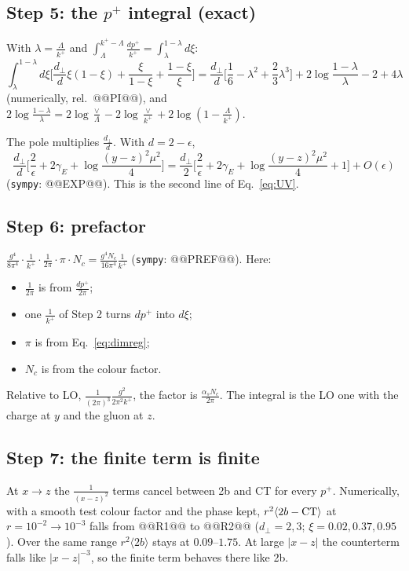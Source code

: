 \documentclass[10pt]{article}
\numberwithin{equation}{section}
\begin{document}
\subsection*{Step 5: the \texorpdfstring{$p^+$}{p+} integral (exact)}
With $\lambda=\frac{\Lambda}{k^+}$ and $\int_\Lambda^{k^+-\Lambda}\frac{dp^+}{k^+}=\int_\lambda^{1-\lambda}d\xi$:
\begin{equation}
\int_\lambda^{1-\lambda}d\xi\Big[\frac{d_\perp}{d}\xi(1-\xi)+\frac{\xi}{1-\xi}+\frac{1-\xi}{\xi}\Big]=\frac{d_\perp}{d}\Big[\frac16-\lambda^2+\frac23\lambda^3\Big]+2\log\frac{1-\lambda}{\lambda}-2+4\lambda
\end{equation}
(numerically, rel.\ @@PI@@), and $2\log\frac{1-\lambda}{\lambda}=2\log\frac{\vee}{\Lambda}-2\log\frac{\vee}{k^+}+2\log(1-\frac{\Lambda}{k^+})$.

The pole multiplies $\frac{d_\perp}{d}$. With $d=2-\epsilon$,
\begin{equation*}
\frac{d_\perp}{d}\Big[\frac2\epsilon+2\gamma_E+\log\frac{(y-z)^2\mu^2}{4}\Big]=\frac{d_\perp}{2}\Big[\frac2\epsilon+2\gamma_E+\log\frac{(y-z)^2\mu^2}{4}+1\Big]+O(\epsilon)
\end{equation*}
(\texttt{sympy}: @@EXP@@). This is the second line of Eq.~\eqref{eq:UV}.

\subsection*{Step 6: prefactor}
$\frac{g^4}{8\pi^4}\cdot\frac{1}{k^+}\cdot\frac{1}{2\pi}\cdot\pi\cdot N_c=\frac{g^4N_c}{16\pi^4}\frac{1}{k^+}$ (\texttt{sympy}: @@PREF@@). Here:
\begin{itemize}
\item $\frac{1}{2\pi}$ is from $\frac{dp^+}{2\pi}$;
\item one $\frac{1}{k^+}$ of Step 2 turns $dp^+$ into $d\xi$;
\item $\pi$ is from Eq.~\eqref{eq:dimreg};
\item $N_c$ is from the colour factor.
\end{itemize}
Relative to LO, $\frac{1}{(2\pi)^3}\frac{g^2}{2\pi^2k^+}$, the factor is $\frac{\alpha_sN_c}{2\pi}$. The integral is the LO one with the charge at $y$ and the gluon at $z$.

\subsection*{Step 7: the finite term is finite}
At $x\to z$ the $\frac{1}{(x-z)^2}$ terms cancel between 2b and CT for every $p^+$. Numerically, with a smooth test colour factor and the phase kept, $r^2\langle 2b-{\rm CT}\rangle$ at $r=10^{-2}\to10^{-3}$ falls from @@R1@@ to @@R2@@ ($d_\perp=2,3$; $\xi=0.02,0.37,0.95$). Over the same range $r^2\langle 2b\rangle$ stays at $0.09$--$1.75$. At large $|x-z|$ the counterterm falls like $|x-z|^{-3}$, so the finite term behaves there like 2b.
\end{document}
